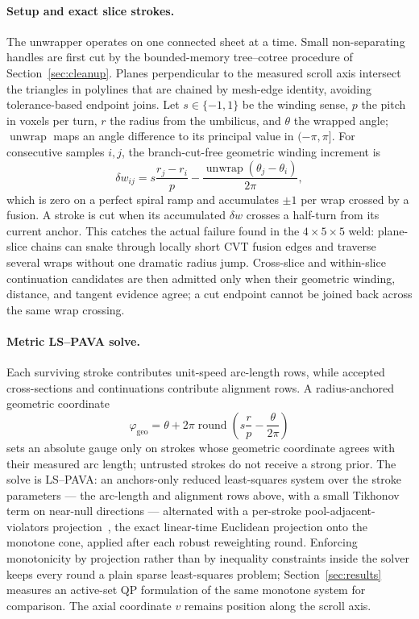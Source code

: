\paragraph{Setup and exact slice strokes.} The unwrapper operates on one connected sheet at a time. Small non-separating handles are first cut by the bounded-memory tree--cotree procedure of Section~\ref{sec:cleanup}. Planes perpendicular to the measured scroll axis intersect the triangles in polylines that are chained by mesh-edge identity, avoiding tolerance-based endpoint joins. Let $s\in\{-1,1\}$ be the winding sense, $p$ the pitch in voxels per turn, $r$ the radius from the umbilicus, and $\theta$ the wrapped angle; $\operatorname{unwrap}$ maps an angle difference to its principal value in $(-\pi,\pi]$. For consecutive samples $i,j$, the branch-cut-free geometric winding increment is
\begin{equation*}
  \delta w_{ij}=s\frac{r_j-r_i}{p}-\frac{\operatorname{unwrap}(\theta_j-\theta_i)}{2\pi},
\end{equation*}
which is zero on a perfect spiral ramp and accumulates $\pm1$ per wrap crossed by a fusion.
A stroke is cut when its accumulated $\delta w$ crosses a half-turn from its current anchor. This catches the actual failure found in the $4\times5\times5$ weld: plane-slice chains can snake through locally short CVT fusion edges and traverse several wraps without one dramatic radius jump. Cross-slice and within-slice continuation candidates are then admitted only when their geometric winding, distance, and tangent evidence agree; a cut endpoint cannot be joined back across the same wrap crossing.

\paragraph{Metric LS--PAVA solve.} Each surviving stroke contributes unit-speed arc-length rows, while accepted cross-sections and continuations contribute alignment rows. A radius-anchored geometric coordinate
\begin{equation*}
  \varphi_{\mathrm{geo}}=\theta+2\pi\operatorname{round}\!\left(s\frac{r}{p}-\frac{\theta}{2\pi}\right)
\end{equation*}
sets an absolute gauge only on strokes whose geometric coordinate agrees with their measured arc length; untrusted strokes do not receive a strong prior. The solve is LS--PAVA: an anchors-only reduced least-squares system over the stroke parameters --- the arc-length and alignment rows above, with a small Tikhonov term on near-null directions --- alternated with a per-stroke pool-adjacent-violators projection~\cite{barlow1972statistical}, the exact linear-time Euclidean projection onto the monotone cone, applied after each robust reweighting round. Enforcing monotonicity by projection rather than by inequality constraints inside the solver keeps every round a plain sparse least-squares problem; Section~\ref{sec:results} measures an active-set QP formulation of the same monotone system for comparison. The axial coordinate $v$ remains position along the scroll axis.

